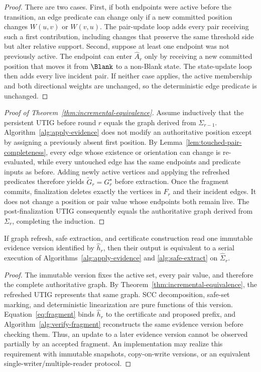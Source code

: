 \begin{proof}
There are two cases.  First, if both endpoints were active before the
transition, an edge predicate can change only if a new committed position
changes $W(u,v)$ or $W(v,u)$.  The pair-update loop adds every pair receiving
such a first contribution, including changes that preserve the same threshold
side but alter relative support.  Second, suppose at least one endpoint was
not previously active.  The endpoint can enter $\widehat A_r$ only by receiving
a new committed position that moves it from $\Blank$ to a non-Blank state.
The state-update loop then adds every live incident pair.  If neither case
applies, the active membership and both directional weights are unchanged, so
the deterministic edge predicate is unchanged.
\end{proof}

\begin{proof}[Proof of Theorem~\ref{thm:incremental-equivalence}]
Assume inductively that the persistent UTIG before round $r$ equals the graph
derived from $\Sigma_{r-1}$.  Algorithm~\ref{alg:apply-evidence} does not modify
an authoritative position except by assigning a previously absent first
position.  By Lemma~\ref{lem:touched-pair-completeness}, every edge whose
existence or orientation can change is re-evaluated, while every untouched
edge has the same endpoints and predicate inputs as before.  Adding newly
active vertices and applying the refreshed predicates therefore yields
$\widetilde G_r=G_r^\star$ before extraction.  Once the fragment commits,
finalization deletes exactly the vertices in $F_r$ and their incident edges.
It does not change a position or pair value whose endpoints both remain live.
The post-finalization UTIG consequently equals the authoritative graph derived
from $\Sigma_r$, completing the induction.
\end{proof}

\begin{lemma}
\label{lem:version-consistent-extraction}
If graph refresh, safe extraction, and certificate construction read one
immutable evidence version identified by $\widehat h_r$, then their output is
equivalent to a serial execution of Algorithms~\ref{alg:apply-evidence} and
\ref{alg:safe-extract} on $\widehat\Sigma_r$.
\end{lemma}

\begin{proof}
The immutable version fixes the active set, every pair value, and therefore
the complete authoritative graph.  By
Theorem~\ref{thm:incremental-equivalence}, the refreshed UTIG represents that
same graph.  SCC decomposition, safe-set marking, and deterministic
linearization are pure functions of this version.  Equation~\eqref{eq:fragment}
binds $\widehat h_r$ to the certificate and proposed prefix, and
Algorithm~\ref{alg:verify-fragment} reconstructs the same evidence version
before checking them.  Thus, an update to a later evidence version cannot be
observed partially by an accepted fragment.  An implementation may realize
this requirement with immutable snapshots, copy-on-write versions, or an
equivalent single-writer/multiple-reader protocol.
\end{proof}

